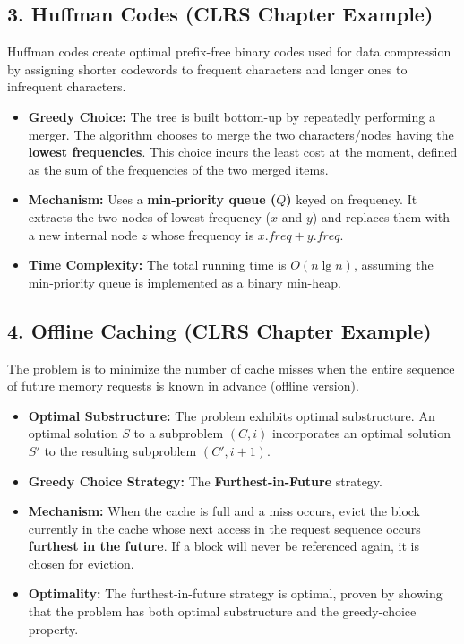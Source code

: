 \documentclass{article}
\begin{document}
\subsection{3. Huffman Codes (CLRS Chapter Example)}

Huffman codes create optimal prefix-free binary codes used for data compression by assigning shorter codewords to frequent characters and longer ones to infrequent characters.

\begin{itemize}
    \item \textbf{Greedy Choice:} The tree is built bottom-up by repeatedly performing a merger. The algorithm chooses to merge the two characters/nodes having the \textbf{lowest frequencies}. This choice incurs the least cost at the moment, defined as the sum of the frequencies of the two merged items.
    \item \textbf{Mechanism:} Uses a \textbf{min-priority queue ($Q$)} keyed on frequency. It extracts the two nodes of lowest frequency ($x$ and $y$) and replaces them with a new internal node $z$ whose frequency is $x.freq + y.freq$.
    \item \textbf{Time Complexity:} The total running time is $O(n \lg n)$, assuming the min-priority queue is implemented as a binary min-heap.
\end{itemize}

\subsection{4. Offline Caching (CLRS Chapter Example)}

The problem is to minimize the number of cache misses when the entire sequence of future memory requests is known in advance (offline version).

\begin{itemize}
    \item \textbf{Optimal Substructure:} The problem exhibits optimal substructure. An optimal solution $S$ to a subproblem $(C, i)$ incorporates an optimal solution $S'$ to the resulting subproblem $(C', i+1)$.
    \item \textbf{Greedy Choice Strategy:} The \textbf{Furthest-in-Future} strategy.
    \item \textbf{Mechanism:} When the cache is full and a miss occurs, evict the block currently in the cache whose next access in the request sequence occurs \textbf{furthest in the future}. If a block will never be referenced again, it is chosen for eviction.
    \item \textbf{Optimality:} The furthest-in-future strategy is optimal, proven by showing that the problem has both optimal substructure and the greedy-choice property.
\end{itemize}
\end{document}
